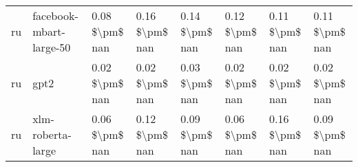 \begin{tabular}{llllllll}
      ru &            facebook-mbart-large-50 & 0.08 \$\textbackslash pm\$ nan &            0.16 \$\textbackslash pm\$ nan &        0.14 \$\textbackslash pm\$ nan &         0.12 \$\textbackslash pm\$ nan &                          0.11 \$\textbackslash pm\$ nan &     0.11 \$\textbackslash pm\$ nan \\
      ru &                               gpt2 & 0.02 \$\textbackslash pm\$ nan &            0.02 \$\textbackslash pm\$ nan &        0.03 \$\textbackslash pm\$ nan &         0.02 \$\textbackslash pm\$ nan &                          0.02 \$\textbackslash pm\$ nan &     0.02 \$\textbackslash pm\$ nan \\
      ru &                  xlm-roberta-large & 0.06 \$\textbackslash pm\$ nan &            0.12 \$\textbackslash pm\$ nan &        0.09 \$\textbackslash pm\$ nan &         0.06 \$\textbackslash pm\$ nan &                          0.16 \$\textbackslash pm\$ nan &     0.09 \$\textbackslash pm\$ nan \\
\bottomrule
\end{tabular}
